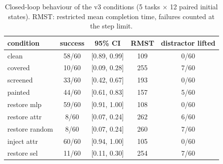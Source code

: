 \begin{table}[t]
\centering\small
\caption{Closed-loop behaviour of the v3 conditions (5 tasks $\times$ 12 paired initial states). RMST: restricted mean completion time, failures counted at the step limit.}
\label{tab_E0_behaviour}
\begin{tabular}{l c c c c}
\toprule
condition & success & 95\% CI & RMST & distractor lifted \\
\midrule
clean & 58/60 &  [0.89, 0.99] & 109 & 0/60 \\
covered & 10/60 &  [0.09, 0.28] & 255 & 7/60 \\
screened & 33/60 &  [0.42, 0.67] & 193 & 0/60 \\
painted & 44/60 &  [0.61, 0.83] & 157 & 5/60 \\
restore mlp & 59/60 &  [0.91, 1.00] & 108 & 0/60 \\
restore attr & 8/60 &  [0.07, 0.24] & 262 & 6/60 \\
restore random & 8/60 &  [0.07, 0.24] & 260 & 7/60 \\
inject attr & 60/60 &  [0.94, 1.00] & 105 & 0/60 \\
restore sel & 11/60 &  [0.11, 0.30] & 254 & 7/60 \\
\bottomrule
\end{tabular}
\end{table}
